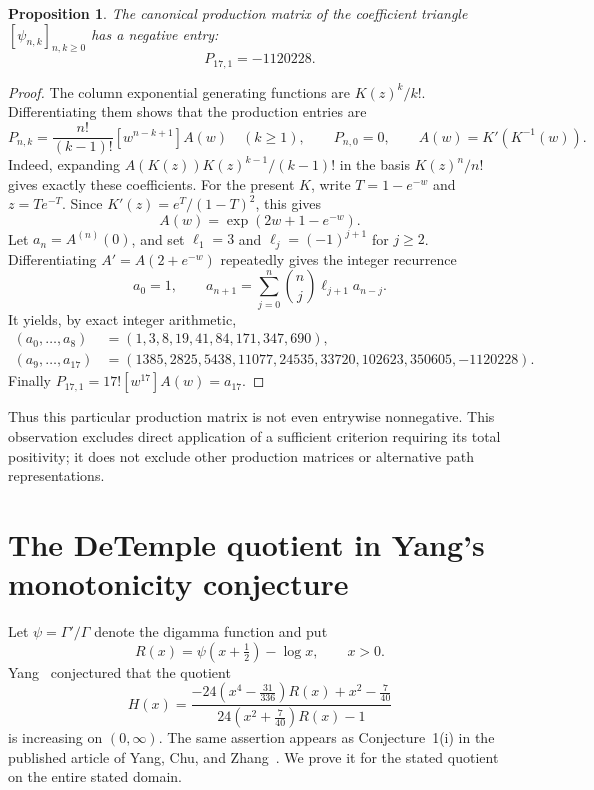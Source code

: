 \documentclass[11pt,a4paper]{article}
\newtheorem{proposition}[theorem]{Proposition}
\theoremstyle{definition}
\theoremstyle{remark}
\numberwithin{equation}{section}
\begin{document}
\begin{proposition}
\label{prop:tp-production-obstruction}
The canonical production matrix of the coefficient triangle
$[\psi_{n,k}]_{n,k\geq0}$ has a negative entry:
\[
 P_{17,1}=-1120228.
\]
\end{proposition}
\begin{proof}
The column exponential generating functions are $K(z)^k/k!$.
Differentiating them shows that the production entries are
\[
 P_{n,k}=\frac{n!}{(k-1)!}[w^{n-k+1}]A(w)\quad(k\geq1),
 \qquad P_{n,0}=0,
 \qquad A(w)=K'(K^{-1}(w)).
\]
Indeed, expanding $A(K(z))K(z)^{k-1}/(k-1)!$ in the basis
$K(z)^n/n!$ gives exactly these coefficients.
For the present $K$, write $T=1-e^{-w}$ and $z=Te^{-T}$.
Since $K'(z)=e^T/(1-T)^2$, this gives
\begin{equation}
 A(w)=\exp(2w+1-e^{-w}).
 \label{eq:tp-production-A}
\end{equation}
Let $a_n=A^{(n)}(0)$, and set $\ell_1=3$ and
$\ell_j=(-1)^{j+1}$ for $j\geq2$.  Differentiating
$A'=A(2+e^{-w})$ repeatedly gives the integer recurrence
\[
 a_0=1,\qquad
 a_{n+1}=\sum_{j=0}^n\binom nj\ell_{j+1}a_{n-j}.
\]
It yields, by exact integer arithmetic,
\begin{align*}
 (a_0,\ldots,a_8)
   &=(1,3,8,19,41,84,171,347,690),\\
 (a_9,\ldots,a_{17})
   &=(1385,2825,5438,11077,24535,33720,102623,350605,-1120228).
\end{align*}
Finally $P_{17,1}=17![w^{17}]A(w)=a_{17}$.
\end{proof}

Thus this particular production matrix is not even entrywise
nonnegative.  This observation excludes direct application of a
sufficient criterion requiring its total positivity; it does not
exclude other production matrices or alternative path representations.


\section{The DeTemple quotient in Yang's monotonicity conjecture}
\label{sec:yang}

Let $\psi=\Gamma'/\Gamma$ denote the digamma function and put
\begin{equation}\label{eq:yang-R}
 R(x)=\psi\!\left(x+\tfrac12\right)-\log x,\qquad x>0.
\end{equation}
Yang~\cite[Conjecture~1(i)]{Yang2014} conjectured that the quotient
\begin{equation}\label{eq:yang-original}
 H(x)=
 \frac{-24\left(x^4-\frac{31}{336}\right)R(x)
                  +x^2-\frac7{40}}
      {24\left(x^2+\frac7{40}\right)R(x)-1}
\end{equation}
is increasing on $(0,\infty)$. The same assertion appears as
Conjecture~1(i) in the published article of Yang, Chu, and
Zhang~\cite{YangChuZhang2015}. We prove it for the stated quotient on
the entire stated domain.
\end{document}
